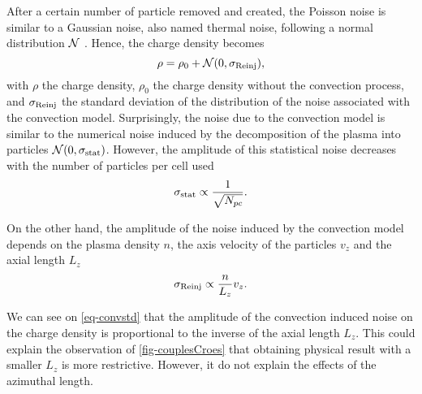     After a certain number of particle removed and created, the Poisson noise is similar to a Gaussian noise, also named thermal noise, following a normal distribution $\mathcal{N}$ .
    Hence, the charge density becomes
    \begin{equation} \label{eq-rhonoise}
      \rho = \rho_0 + \mathcal{N}(0, \sigma_{\rm Reinj}),
    \end{equation}
    with $\rho$ the charge density, $\rho_0$ the charge density without the convection process, and $\sigma_{\rm Reinj}$ the standard deviation of the distribution of the noise associated with the convection model.
    Surprisingly, the noise due to the convection model is similar to the numerical noise induced by the decomposition of the plasma into particles $\mathcal{N}(0, \sigma_{\rm stat})$.
    However, the amplitude of this statistical noise decreases with the number of particles per cell used
    \begin{equation*} \label{eq-statistical}
     \sigma_{\rm stat} \propto \frac{1}{\sqrt{N_{pc}}}.
    \end{equation*}

    On the other hand, the amplitude of the noise induced by the convection model depends on the plasma density $n$, the axis velocity of the particles $v_z$ and the axial length $L_z$
    \begin{equation} \label{eq-convstd}
     \sigma_{\rm Reinj} \propto \frac{n}{L_z} v_z.
    \end{equation}

    We can see on \cref{eq-convstd} that the amplitude of the convection induced noise on the charge density is proportional to the inverse of the axial length $L_z$.
    This could explain the observation of \cref{fig-couplesCroes} that obtaining physical result with a smaller $L_z$ is more restrictive.
    However, it do not explain the effects of the azimuthal length.

